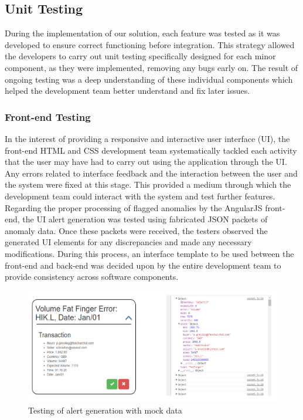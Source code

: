\documentclass[12pt]{article}
\begin{document}
  \subsection{Unit Testing}
  During the implementation of our solution, each feature was tested as it was developed to ensure correct functioning before integration.
  This strategy allowed the developers to carry out unit testing specifically designed for each minor component, as they were implemented, removing any bugs early on.
  The result of ongoing testing was a deep understanding of these individual components which helped the development team better understand and fix later issues.
    \subsubsection{Front-end Testing}
    In the interest of providing a responsive and interactive user interface (UI), the front-end HTML and CSS development team systematically tackled each activity
    that the user may have had to carry out using the application through the UI. Any errors related to interface feedback and the interaction between the user and the system were fixed at this stage.
    This provided a medium through which the development team could interact with the system and test further features.
    \newline
    Regarding the proper processing of flagged anomalies by the AngularJS front-end, the UI alert generation was tested using fabricated JSON packets of anomaly data.
    Once these packets were received, the testers observed the generated UI elements for any discrepancies and made any necessary modifications.
    During this process, an interface template to be used between the front-end and back-end was decided upon by the entire development team to provide consistency across software components.
    \begin{figure}[H]
    \centering
    \includegraphics[width=130mm]{test1.png}
    \caption{Testing of alert generation with mock data}
    \end{figure}
\end{document}

